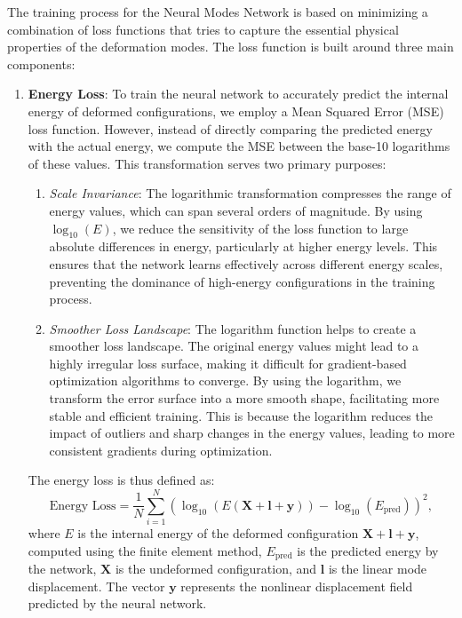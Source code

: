 The training process for the Neural Modes Network is based on minimizing a combination of loss functions that tries to capture the essential physical properties of the deformation modes. The loss function is built around three main components:
\begin{enumerate}
    \item \textbf{Energy Loss}: To train the neural network to accurately predict the internal energy of deformed configurations, we employ a Mean Squared Error (MSE) loss function.  However, instead of directly comparing the predicted energy with the actual energy, we compute the MSE between the base-10 logarithms of these values. This transformation serves two primary purposes:

    \begin{enumerate}
        \item \textit{Scale Invariance}:  The logarithmic transformation compresses the range of energy values, which can span several orders of magnitude. By using $\log_{10}(E)$, we reduce the sensitivity of the loss function to large absolute differences in energy, particularly at higher energy levels. This ensures that the network learns effectively across different energy scales, preventing the dominance of high-energy configurations in the training process.

        \item \textit{Smoother Loss Landscape}: The logarithm function helps to create a smoother loss landscape.  The original energy values might lead to a highly irregular loss surface, making it difficult for gradient-based optimization algorithms to converge. By using the logarithm, we transform the error surface into a more smooth shape, facilitating more stable and efficient training.  This is because the logarithm reduces the impact of outliers and sharp changes in the energy values, leading to more consistent gradients during optimization.
    \end{enumerate}

    The energy loss is thus defined as:
    \begin{equation}
        \text{Energy Loss} = \frac{1}{N} \sum_{i=1}^N (\log_{10}(E(\bm{X} + \bm{l} + \bm{y})) - \log_{10}(E_{\text{pred}}))^2,
    \end{equation}
    where \( E \) is the internal energy of the deformed configuration \( \bm{X} + \bm{l} + \bm{y} \), computed using the finite element method, \( E_{\text{pred}} \) is the predicted energy by the network, \( \bm{X} \) is the undeformed configuration, and \( \bm{l} \) is the linear mode displacement.  The vector \(\bm{y}\) represents the nonlinear displacement field predicted by the neural network.
    

\end{enumerate}
